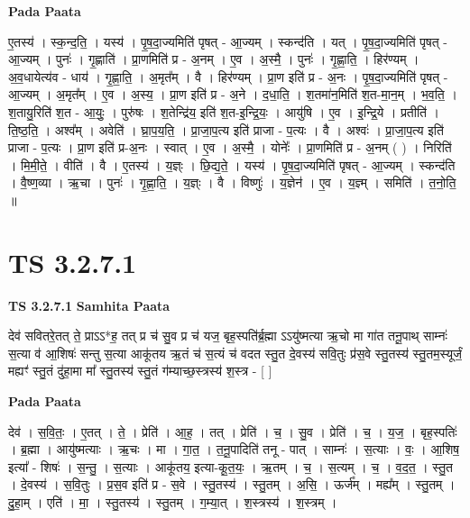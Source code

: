 \documentclass[17pt]{extarticle}
\begin{document}
\textbf{Pada Paata} \newline

ए॒तस्य॑ । स्क॒न्द॒ति॒ । यस्य॑ । पृ॒ष॒दा॒ज्यमिति॑ पृषत् - आ॒ज्यम् । स्कन्द॑ति । यत् । पृ॒ष॒दा॒ज्यमिति॑ पृषत् - आ॒ज्यम् । पुनः॑ । गृ॒ह्णाति॑ । प्रा॒णमिति॑ प्र - अ॒नम् । ए॒व । अ॒स्मै॒ । पुनः॑ । गृ॒ह्णा॒ति॒ । हिर॑ण्यम् । अ॒व॒धायेत्य॑व - धाय॑ । गृ॒ह्णा॒ति॒ । अ॒मृत᳚म् । वै । हिर॑ण्यम् । प्रा॒ण इति॑ प्र - अ॒नः । पृ॒ष॒दा॒ज्यमिति॑ पृषत् - आ॒ज्यम् । अ॒मृत᳚म् । ए॒व । अ॒स्य॒ । प्रा॒ण इति॑ प्र - अ॒ने । द॒धा॒ति॒ । श॒तमा॑न॒मिति॑ श॒त-मा॒न॒म् । भ॒व॒ति॒ । श॒तायु॒रिति॑ श॒त - आ॒युः॒ । पुरु॑षः । श॒तेन्द्रि॑य॒ इति॑ श॒त-इ॒न्द्रि॒यः॒ । आयु॑षि । ए॒व । इ॒न्द्रि॒ये । प्रतीति॑ । ति॒ष्ठ॒ति॒ । अश्व᳚म् । अवेति॑ । घ्रा॒प॒य॒ति॒ । प्रा॒जा॒प॒त्य इति॑ प्राजा - प॒त्यः । वै । अश्वः॑ । प्रा॒जा॒प॒त्य इति॑ प्राजा - प॒त्यः । प्रा॒ण इति॑ प्र-अ॒नः । स्वात् । ए॒व । अ॒स्मै॒ । योनेः᳚ । प्रा॒णमिति॑ प्र - अ॒नम् ( ) । निरिति॑ । मि॒मी॒ते॒ । वीति॑ । वै । ए॒तस्य॑ । य॒ज्ञ्ः । छि॒द्य॒ते॒ । यस्य॑ । पृ॒ष॒दा॒ज्यमिति॑ पृषत् - आ॒ज्यम् । स्कन्द॑ति । वै॒ष्ण॒व्या । ऋ॒चा । पुनः॑ । गृ॒ह्णा॒ति॒ । य॒ज्ञ्ः । वै । विष्णुः॑ । य॒ज्ञेन॑ । ए॒व । य॒ज्ञ्म् । समिति॑ । त॒नो॒ति॒ ॥  \newline





\section{ TS 3.2.7.1 }

\textbf{TS 3.2.7.1 } \newline
\textbf{Samhita Paata} \newline

देव॑ सवितरे॒तत् ते॒ प्राऽऽ*ह॒ तत् प्र च॑ सु॒व प्र च॑ यज॒ बृह॒स्पति॑र्ब्र॒ह्मा ऽऽयु॑ष्मत्या ऋ॒चो मा गा॑त तनू॒पाथ् साम्नः॑ स॒त्या व॑ आ॒शिषः॑ सन्तु स॒त्या आकू॑तय ऋ॒तं च॑ स॒त्यं च॑ वदत स्तु॒त दे॒वस्य॑ सवि॒तुः प्र॑स॒वे स्तु॒तस्य॑ स्तु॒तम॒स्यूर्जं॒ मह्यꣳ॑ स्तु॒तं दु॑हा॒मा मा᳚ स्तु॒तस्य॑ स्तु॒तं ग॑म्याच्छ॒स्त्रस्य॑ श॒स्त्र - [  ] \newline

\textbf{Pada Paata} \newline

देव॑ । स॒वि॒तः॒ । ए॒तत् । ते॒ । प्रेति॑ । आ॒ह॒ । तत् । प्रेति॑ । च॒ । सु॒व । प्रेति॑ । च॒ । य॒ज॒ । बृह॒स्पतिः॑ । ब्र॒ह्मा । आयु॑ष्मत्याः । ऋ॒चः । मा । गा॒त॒ । त॒नू॒पादिति॑ तनू - पात् । साम्नः॑ । स॒त्याः । वः॒ । आ॒शिष॒ इत्या᳚ - शिषः॑ । स॒न्तु॒ । स॒त्याः । आकू॑तय॒ इत्या-कू॒त॒यः॒ । ऋ॒तम् । च॒ । स॒त्यम् । च॒ । व॒द॒त॒ । स्तु॒त । दे॒वस्य॑ । स॒वि॒तुः । प्र॒स॒व इति॑ प्र - स॒वे । स्तु॒तस्य॑ । स्तु॒तम् । अ॒सि॒ । ऊर्ज᳚म् । मह्य᳚म् । स्तु॒तम् । दु॒हा॒म् । एति॑ । मा॒ । स्तु॒तस्य॑ । स्तु॒तम् । ग॒म्या॒त् । श॒स्त्रस्य॑ । श॒स्त्रम् ।  \newline
\end{document}
